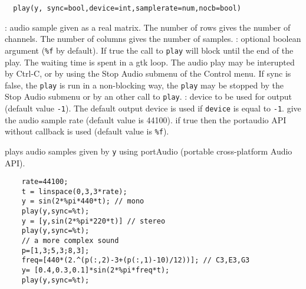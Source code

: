 
\begin{mandesc}
\end{mandesc}
\begin{calling_sequence}
\begin{verbatim}
  play(y, sync=bool,device=int,samplerate=num,nocb=bool)  
\end{verbatim}
\end{calling_sequence}
\begin{parameters}
  \begin{varlist}
    : audio sample given as a real matrix. The number of 
    rows gives the number of channels. The number of columns gives 
    the number of samples.
    : optional boolean argument (\verb+%f+ by default). If true the call to \verb+play+ 
    will block until the end of the play. The waiting time is spent
    in a gtk loop. The audio play may be interupted by 
    Ctrl-C, or by using the Stop Audio submenu of the Control menu. 
    If sync is false, the \verb+play+ is run in a non-blocking way, the 
    \verb+play+ may be stopped by the  Stop Audio submenu or by an other call 
    to \verb+play+. 
   : device to be used for output (default value \verb+-1+). The default output 
   device is used if \verb+device+ is equal to \verb+-1+.
    give the audio sample rate (default value is 44100).
    if true then the portaudio API without callback is used 
   (default value is \verb+%f+).
  \end{varlist}
\end{parameters}

\begin{mandescription}
  plays audio samples given by \verb+y+ using portAudio (portable cross-platform Audio API).
\end{mandescription}
\begin{examples}
  \begin{Verbatim}
    rate=44100;
    t = linspace(0,3,3*rate);
    y = sin(2*%pi*440*t); // mono 
    play(y,sync=%t);
    y = [y,sin(2*%pi*220*t)] // stereo
    play(y,sync=%t);
    // a more complex sound 
    p=[1,3;5,3;8,3]; 
    freq=[440*(2.^(p(:,2)-3+(p(:,1)-10)/12))]; // C3,E3,G3
    y= [0.4,0.3,0.1]*sin(2*%pi*freq*t);
    play(y,sync=%t);
  \end{Verbatim}
\end{examples}
\begin{manseealso}
\end{manseealso}

